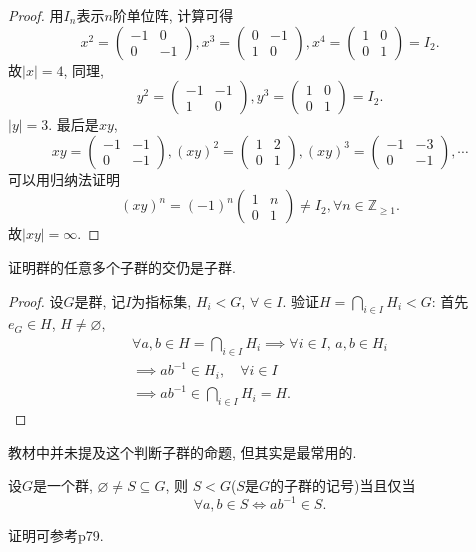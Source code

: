 \begin{proof}
    用$I_n$表示$n$阶单位阵, 计算可得
\[
x^2 = \begin{pmatrix} 
    -1 & 0 \\
    0 & -1
\end{pmatrix},
x^3 = \begin{pmatrix}
    0 & -1 \\
    1 & 0
\end{pmatrix},
x^4 = \begin{pmatrix}
    1 & 0 \\
    0 & 1
\end{pmatrix} = I_2.
\]
故$|x| = 4$, 同理,
\[
y^2 = \begin{pmatrix}
    -1 & -1 \\
    1 & 0
\end{pmatrix},
y^3 = \begin{pmatrix}
    1 & 0 \\
    0 & 1
\end{pmatrix} = I_2.
\]
$|y| = 3$.
最后是$xy$,
\[
xy = \begin{pmatrix}
    -1 & -1 \\
    0 & -1
\end{pmatrix},
(xy)^2 = \begin{pmatrix}
    1 & 2 \\
    0 & 1
\end{pmatrix},
(xy)^3 = \begin{pmatrix}
    -1 & -3 \\
    0 & -1
\end{pmatrix}, \cdots
\]
可以用归纳法证明
\[
    (xy)^n = (-1)^n\begin{pmatrix}
        1 & n \\
        0 & 1
    \end{pmatrix} \neq I_2, \forall n \in \mathbb{Z}_{\geqslant 1}.
\]
故$|xy| = \infty$.
\end{proof}
    
\begin{problem}
    证明群的任意多个子群的交仍是子群.
\end{problem}

\begin{proof}
    设$G$是群, 记$I$为指标集, $H_i < G,\, \forall \in I$.
验证\(H = \displaystyle\bigcap_{i \in I} H_i < G\): 首先$e_G \in H$, $H \neq \varnothing$,
\[
\begin{gathered}
    \forall a, b \in H = \bigcap_{i \in I} H_i \implies \forall i \in I,\,a, b \in H_i\\
    \implies ab^{-1} \in H_i, \quad \forall i \in I\\
    \implies ab^{-1} \in \bigcap_{i \in I} H_i = H.
\end{gathered}
\]
\end{proof}

\begin{remark}
    教材中并未提及这个判断子群的命题, 但其实是最常用的.

\begin{propstar}[子群的判定]
    设$G$是一个群, $\varnothing \neq S \subseteq G$, 则
$S < G$($S$是$G$的子群的记号)当且仅当
\[
    \forall a, b \in S \iff ab^{-1} \in S.
\]
\end{propstar}
证明可参考\cite{aluffi2009algebra}p79.
\end{remark}